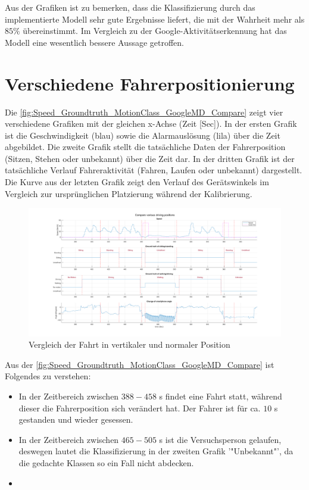 Aus der Grafiken ist zu bemerken, dass die Klassifizierung durch das implementierte Modell sehr gute Ergebnisse liefert, die mit der Wahrheit mehr als $85\%$ übereinstimmt. Im Vergleich zu der Google-Aktivitätserkennung hat das Modell eine wesentlich bessere Aussage getroffen.



\section{Verschiedene Fahrerpositionierung}
Die \autoref{fig:Speed_Groundtruth_MotionClass_GoogleMD_Compare} zeigt vier verschiedene Grafiken mit der gleichen x-Achse (Zeit [Sec]).
In der ersten Grafik ist die Geschwindigkeit (blau) sowie die Alarmauslösung (lila) über die Zeit abgebildet.
Die zweite Grafik stellt die tatsächliche Daten der Fahrerposition (Sitzen, Stehen oder unbekannt) über die Zeit dar.
In der dritten Grafik ist der tatsächliche Verlauf Fahreraktivität (Fahren, Laufen oder unbekannt) dargestellt.
Die Kurve aus der letzten Grafik zeigt den Verlauf des Gerätswinkels im Vergleich zur ursprünglichen Platzierung während der Kalibrierung. 

\begin{figure}[H]
	\centering
	\includegraphics[width=\linewidth]{Bilder/Speed_Groundtruth_WalkStand_Compare.png}
	\caption{Vergleich der Fahrt in vertikaler und normaler Position}
	\label{fig:Speed_Groundtruth_WalkStand_Compare}
\end{figure}


Aus der \autoref{fig:Speed_Groundtruth_MotionClass_GoogleMD_Compare} ist Folgendes zu verstehen:

\begin{itemize}
	\item In der Zeitbereich zwischen $388 - 458$ s findet eine Fahrt statt, während dieser die Fahrerposition sich verändert hat. Der Fahrer ist für ca. $10$ s gestanden und wieder gesessen.
	\item In der Zeitbereich zwischen $465 - 505$ s ist die Versuchsperson gelaufen, deswegen lautet die Klassifizierung in der zweiten Grafik '"Unbekannt"', da die gedachte Klassen so ein Fall nicht abdecken.
	\item  
\end{itemize}

